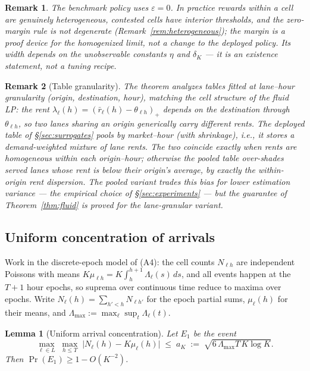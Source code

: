 \documentclass[11pt]{article}
\newtheorem{lemma}{Lemma}
\newtheorem{remark}{Remark}
\begin{document}
\begin{remark}
The benchmark policy uses $\varepsilon = 0$. In practice rewards within
a cell are genuinely heterogeneous, contested cells have interior
thresholds, and the zero-margin rule is not degenerate
(Remark~\ref{rem:heterogeneous}); the margin is a proof device for the
homogenized limit, not a change to the deployed policy. Its width
depends on the unobservable constants $\eta$ and $\delta_K$ --- it is
an existence statement, not a tuning recipe.
\end{remark}

\begin{remark}[Table granularity]
\label{rem:granularity}
The theorem analyzes tables fitted at \emph{lane--hour} granularity
(origin, destination, hour), matching the cell structure of the fluid
LP: the rent $\lambda_{\ell}(h) = (\bar{r}_{\ell}(h) -
\theta_{\ell h})_+$ depends on the destination through
$\theta_{\ell h}$, so two lanes sharing an origin generically carry
different rents. The deployed table of \S\ref{sec:surrogates} pools
by \emph{market--hour} (with shrinkage), i.e., it stores a
demand-weighted mixture of lane rents. The two coincide exactly when
rents are homogeneous within each origin--hour; otherwise the pooled
table over-shades served lanes whose rent is below their origin's
average, by exactly the within-origin rent dispersion. The pooled
variant trades this bias for lower estimation variance --- the
empirical choice of \S\ref{sec:experiments} --- but the guarantee of
Theorem~\ref{thm:fluid} is proved for the lane-granular variant.
\end{remark}

\subsection{Uniform concentration of arrivals}

Work in the discrete-epoch model of (A4): the cell counts
$N_{\ell h}$ are independent Poissons with means
$K \mu_{\ell h} = K \int_h^{h+1} \Lambda_{\ell}(s)\, ds$, and all
events happen at the $T + 1$ hour epochs, so suprema over continuous
time reduce to maxima over epochs. Write
$N_{\ell}(h) = \sum_{h' < h} N_{\ell h'}$ for the epoch partial
sums, $\mu_{\ell}(h)$ for their means, and
$\Lambda_{\max} := \max_{\ell} \sup_{t} \Lambda_{\ell}(t)$.

\begin{lemma}[Uniform arrival concentration]
\label{lem:conc}
Let $E_1$ be the event
\begin{equation}
  \max_{\ell \in L}\; \max_{h \leq T}\;
  \bigl| N_{\ell}(h) - K \mu_{\ell}(h) \bigr|
  \;\leq\; a_K \;:=\; \sqrt{6\, \Lambda_{\max} T\, K \log K}.
\end{equation}
Then $\Pr(E_1) \geq 1 - O(K^{-2})$.
\end{lemma}
\end{document}
